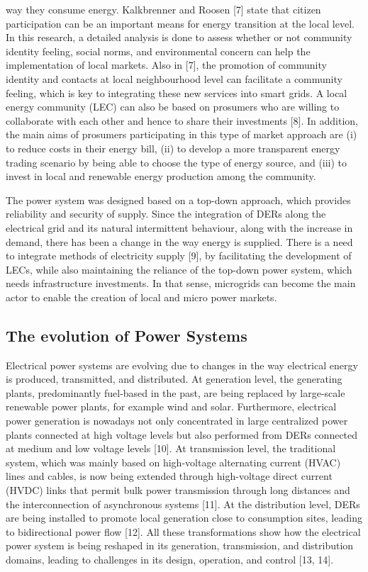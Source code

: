 way they consume energy. Kalkbrenner and Roosen [7] state that citizen participation can be an important means for energy transition at the local level. In this research, a detailed analysis is done to assess whether or not community identity feeling, social norms, and environmental concern can help the implementation of local markets. Also in [7], the promotion of community identity and contacts at local neighbourhood level can facilitate a community feeling, which is key to integrating these new services into smart grids. A local energy community (LEC) can also be based on prosumers who are willing to collaborate with each other and hence to share their investments [8]. In addition, the main aims of prosumers participating in this type of market approach are (i) to reduce costs in their energy bill, (ii) to develop a more transparent energy trading scenario by being able to choose the type of energy source, and (iii) to invest in local and renewable energy production among the community.

The power system was designed based on a top-down approach, which provides reliability and security of supply. Since the integration of DERs along the electrical grid and its natural intermittent behaviour, along with the increase in demand, there has been a change in the way energy is supplied. There is a need to integrate methods of electricity supply [9], by facilitating the development of LECs, while also maintaining the reliance of the top-down power system, which needs infrastructure investments. In that sense, microgrids can become the main actor to enable the creation of local and micro power markets. 

\subsection{The evolution of Power Systems}

Electrical power systems are evolving due to changes in the way electrical energy is produced, transmitted, and distributed. At generation level, the generating plants, predominantly fuel-based in the past, are being replaced by large-scale renewable power plants, for example wind and solar. Furthermore, electrical power generation is nowadays not only concentrated in large centralized power plants connected at high voltage levels but also performed from DERs connected at medium and low voltage levels [10]. At transmission level, the traditional system, which was mainly based on high-voltage alternating current (HVAC) lines and cables, is
now being extended through high-voltage direct current (HVDC) links that permit bulk power transmission through long distances and the interconnection of asynchronous systems [11]. At the distribution level, DERs are being installed to promote local generation close to consumption sites, leading to bidirectional power flow [12]. All these transformations show how the electrical power system is being reshaped in its generation, transmission, and distribution domains, leading to challenges in its design, operation, and control [13, 14]. 

